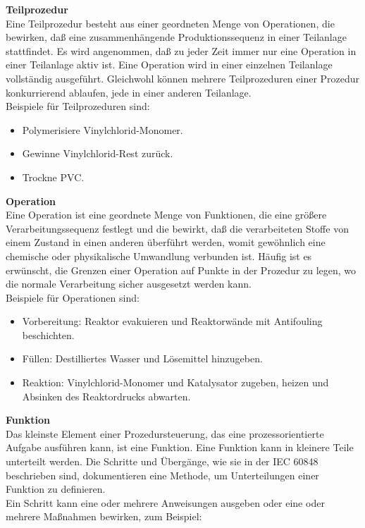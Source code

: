 \textbf{Teilprozedur}\\
Eine Teilprozedur besteht aus einer geordneten Menge von Operationen, die bewirken, daß eine zusammenhängende Produktionssequenz in einer Teilanlage stattfindet. Es wird angenommen, daß zu jeder Zeit immer nur eine Operation in einer Teilanlage aktiv ist. Eine Operation wird in einer einzelnen Teilanlage vollständig ausgeführt. Gleichwohl können mehrere Teilprozeduren einer Prozedur konkurrierend ablaufen, jede in einer anderen Teilanlage.\\
Beispiele für Teilprozeduren sind:
\begin{itemize}
	\item Polymerisiere Vinylchlorid-Monomer.
	\item Gewinne Vinylchlorid-Rest zurück.
	\item Trockne PVC.
\end{itemize}
\textbf{Operation}\\
Eine Operation ist eine geordnete Menge von Funktionen, die eine größere Verarbeitungssequenz festlegt und die bewirkt, daß die verarbeiteten Stoffe von einem Zustand in einen anderen überführt werden, womit gewöhnlich eine chemische oder physikalische Umwandlung verbunden ist. Häufig ist es erwünscht, die Grenzen einer Operation auf Punkte in der Prozedur zu legen, wo die normale Verarbeitung sicher ausgesetzt werden kann.\\
Beispiele für Operationen sind:
\begin{itemize}
	\item Vorbereitung: Reaktor evakuieren und Reaktorwände mit Antifouling beschichten.
	\item Füllen: Destilliertes Wasser und Lösemittel hinzugeben.
	\item Reaktion: Vinylchlorid-Monomer und Katalysator zugeben, heizen und Absinken des Reaktordrucks abwarten.
\end{itemize}
\textbf{Funktion}\\
Das kleinste Element einer Prozedursteuerung, das eine prozessorientierte Aufgabe ausführen kann, ist eine Funktion. Eine Funktion kann in kleinere Teile unterteilt werden. Die Schritte und Übergänge, wie sie in der IEC 60848 beschrieben sind, dokumentieren eine Methode, um Unterteilungen einer Funktion zu definieren.\\
Ein Schritt kann eine oder mehrere Anweisungen ausgeben oder eine oder mehrere Maßnahmen bewirken, zum Beispiel:
